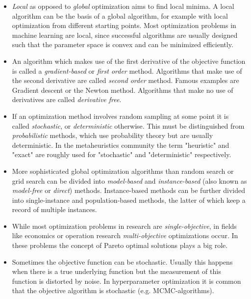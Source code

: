 \documentclass[english]{article}
\begin{document}
\begin{itemize}
  \item \textit{Local} as opposed to \textit{global} optimization aims to find local minima. A local algorithm can be the basis of a global algorithm, for example with local optimization from different starting points. Most optimization problems in machine learning are local, since successful algorithms are usually designed such that the parameter space is convex and can be minimized efficiently.

  \item An algorithm which makes use of the first derivative of the objective function is called a \textit{gradient-based} or \textit{first order} method. Algorithms that make use of the second derivative are called \textit{second order} method. Famous examples are Gradient descent or the Newton method. Algorithms that make no use of derivatives are called \textit{derivative free}.

  \item If an optimization method involves random sampling at some point it is called \textit{stochastic}, or \textit{deterministic} otherwise. This must be distinguished from \textit{probabilistic} methods, which use probability theory but are usually deterministic. In the metaheuristics community the term "heuristic" and "exact" are roughly used for "stochastic" and "deterministic" respectively.

  \item More sophisticated global optimization algorithms than random search or grid search can be divided into \textit{model-based} and \textit{instance-based} (also known as \textit{model-free} or \textit{direct}) methods. Instance-based methods can be further divided into single-instance and population-based methods, the latter of which keep a record of multiple instances.

  \item While most optimization problems in research are \textit{single-objective}, in fields like economics or operation research \textit{multi-objective} optimizations occur. In these problems the concept of Pareto optimal solutions plays a big role.

  \item Sometimes the objective function can be stochastic. Usually this happens when there is a true underlying function but the measurement of this function is distorted by noise. In hyperparameter optimization it is common that the objective algorithm is stochastic (e.g. MCMC-algorithms).

\end{itemize}
\end{document}
